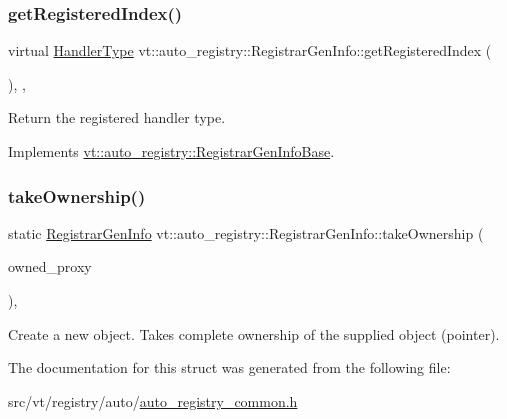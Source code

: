 \subsubsection{\texorpdfstring{get\+Registered\+Index()}{getRegisteredIndex()}}
{\footnotesize\ttfamily virtual \hyperlink{namespacevt_af64846b57dfcaf104da3ef6967917573}{Handler\+Type} vt\+::auto\+\_\+registry\+::\+Registrar\+Gen\+Info\+::get\+Registered\+Index (\begin{DoxyParamCaption}{ }\end{DoxyParamCaption})\hspace{0.3cm}{\ttfamily [inline]}, {\ttfamily [override]}, {\ttfamily [virtual]}}



Return the registered handler type. 



Implements \hyperlink{structvt_1_1auto__registry_1_1_registrar_gen_info_base_ac498c953bb4a951399d66272cae76b05}{vt\+::auto\+\_\+registry\+::\+Registrar\+Gen\+Info\+Base}.

\mbox{\label{structvt_1_1auto__registry_1_1_registrar_gen_info_a5d200e841fd5ac4bd1aee02d67f77c15}} 
\subsubsection{\texorpdfstring{take\+Ownership()}{takeOwnership()}}
{\footnotesize\ttfamily static \hyperlink{structvt_1_1auto__registry_1_1_registrar_gen_info}{Registrar\+Gen\+Info} vt\+::auto\+\_\+registry\+::\+Registrar\+Gen\+Info\+::take\+Ownership (\begin{DoxyParamCaption}\item[{\hyperlink{structvt_1_1auto__registry_1_1_registrar_gen_info_base}{Registrar\+Gen\+Info\+Base} $\ast$}]{owned\+\_\+proxy }\end{DoxyParamCaption})\hspace{0.3cm}{\ttfamily [inline]}, {\ttfamily [static]}}

Create a new object. Takes complete ownership of the supplied object (pointer). 

The documentation for this struct was generated from the following file\+:\begin{DoxyCompactItemize}
\item 
src/vt/registry/auto/\hyperlink{auto__registry__common_8h}{auto\+\_\+registry\+\_\+common.\+h}\end{DoxyCompactItemize}
